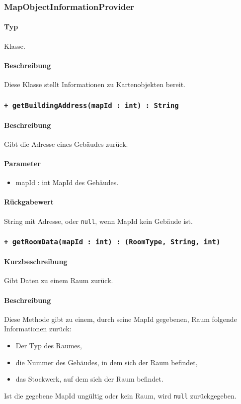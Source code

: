 \subsubsection{MapObjectInformationProvider}
\paragraph*{Typ}
Klasse.
\paragraph*{Beschreibung}
Diese Klasse stellt Informationen zu Kartenobjekten bereit.

\subsubsection*{\texttt{+ getBuildingAddress(mapId : int) : String}}%
\paragraph*{Beschreibung}
Gibt die Adresse eines Gebäudes zurück.
\paragraph*{Parameter}
\begin{itemize}
    \item mapId : int MapId des Gebäudes.
\end{itemize}
\paragraph*{Rückgabewert}
String mit Adresse, oder \texttt{null}, wenn MapId kein Gebäude ist.

\subsubsection*{\texttt{+ getRoomData(mapId : int) : (RoomType, String, int)}}%
\paragraph*{Kurzbeschreibung}
Gibt Daten zu einem Raum zurück.
\paragraph*{Beschreibung}
Diese Methode gibt zu einem, durch seine MapId gegebenen, Raum folgende Informationen zurück:
\begin{itemize}
    \item Der Typ des Raumes,
    \item die Nummer des Gebäudes, in dem sich der Raum befindet,
    \item das Stockwerk, auf dem sich der Raum befindet.
\end{itemize}
Ist die gegebene MapId ungültig oder kein Raum, wird \texttt{null} zurückgegeben.
